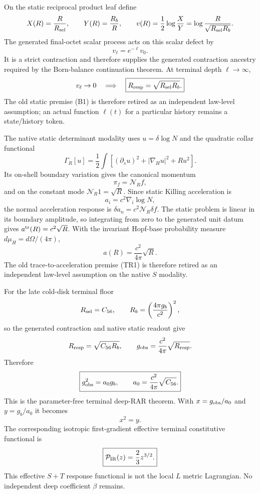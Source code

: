 \documentclass[12pt,a4paper]{article}
\begin{document}
On the static reciprocal product leaf define
\[
 X(R)=\frac{R}{R_{\rm sel}},\qquad
 Y(R)=\frac{R_b}{R},\qquad
 v(R)=\frac12\log\frac{X}{Y}
      =\log\frac{R}{\sqrt{R_{\rm sel}R_b}}.
\]
The generated final-octet scalar process acts on this scalar defect by
\[
 \boxed{v_\ell=e^{-\ell}v_0.}
\]
It is a strict contraction and therefore supplies the generated contraction
ancestry required by the Born-balance continuation theorem.  At terminal depth
$\ell\to\infty$,
\[
 v_\ell\to0
 \quad\Longrightarrow\quad
 \boxed{R_{\rm resp}=\sqrt{R_{\rm sel}R_b}.}
\]
The old static premise (B1) is therefore retired as an independent law-level
assumption; an actual function $\ell(t)$ for a particular history remains a
state/history token.

The native static determinant modality uses $u=\delta\log N$ and the quadratic
collar functional
\[
 \Gamma_R[u]=\frac12\int
 \left[(\partial_su)^2+|\nabla_Hu|^2+Ru^2\right].
\]
Its on-shell boundary variation gives the canonical momentum
\[
 \boxed{\pi_f=\mathcal N_R f},
\]
and on the constant mode $\mathcal N_R1=\sqrt R$.  Since static Killing
acceleration is
\[
 a_i=c^2\nabla_i\log N,
\]
the normal acceleration response is
$\delta a_n=c^2\mathcal N_R\delta f$.  The static problem is linear in its
boundary amplitude, so integrating from zero to the generated unit datum gives
$a^{\rm tr}(R)=c^2\sqrt R$.  With the invariant Hopf-base probability measure
$d\mu_H=d\Omega/(4\pi)$,
\[
 \boxed{a(R)=\frac{c^2}{4\pi}\sqrt R.}
\]
The old trace-to-acceleration premise (TR1) is therefore retired as an
independent law-level assumption on the native $S$ modality.

For the late cold-disk terminal floor
\[
 R_{\rm sel}=C_{56},
 \qquad
 R_b=\left(\frac{4\pi g_b}{c^2}\right)^2,
\]
so the generated contraction and native static readout give
\[
 R_{\rm resp}=\sqrt{C_{56}R_b},
 \qquad
 g_{\rm obs}=\frac{c^2}{4\pi}\sqrt{R_{\rm resp}}.
\]
Therefore
\[
 \boxed{g_{\rm obs}^2=a_0g_b,
 \qquad a_0=\frac{c^2}{4\pi}\sqrt{C_{56}}.}
\]
This is the parameter-free terminal deep-RAR theorem.  With
$x=g_{\rm obs}/a_0$ and $y=g_b/a_0$ it becomes
\[
 \boxed{x^2=y.}
\]
The corresponding isotropic first-gradient effective terminal constitutive
functional is
\[
 \boxed{\mathcal P_{\rm IR}(z)=\frac23z^{3/2}.}
\]
This effective $S+T$ response functional is not the local $L$ metric
Lagrangian.  No independent deep coefficient $\beta$ remains.
\end{document}
